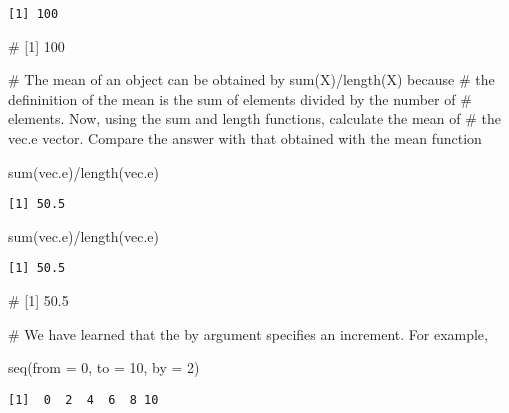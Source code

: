 \documentclass[
  letterpaper,
  DIV=11,
  numbers=noendperiod]{scrartcl}
\newenvironment{Shaded}{\begin{snugshade}}{\end{snugshade}}
\newcommand{\AttributeTok}[1]{\textcolor[rgb]{0.40,0.45,0.13}{#1}}
\newcommand{\CommentTok}[1]{\textcolor[rgb]{0.37,0.37,0.37}{#1}}
\newcommand{\DecValTok}[1]{\textcolor[rgb]{0.68,0.00,0.00}{#1}}
\newcommand{\FunctionTok}[1]{\textcolor[rgb]{0.28,0.35,0.67}{#1}}
\newcommand{\NormalTok}[1]{\textcolor[rgb]{0.00,0.23,0.31}{#1}}
\newcommand{\SpecialCharTok}[1]{\textcolor[rgb]{0.37,0.37,0.37}{#1}}
\begin{document}
\begin{verbatim}
[1] 100
\end{verbatim}

\begin{Shaded}
\begin{Highlighting}[]
\CommentTok{\# [1] 100}

\CommentTok{\# The mean of an object can be obtained by sum(X)/length(X) because}
\CommentTok{\# the defininition of the mean is the sum of elements divided by the number of }
\CommentTok{\# elements. Now, using the sum and length functions, calculate the mean of }
\CommentTok{\# the vec.e vector. Compare the answer with that obtained with the mean function}


\FunctionTok{sum}\NormalTok{(vec.e)}\SpecialCharTok{/}\FunctionTok{length}\NormalTok{(vec.e)}
\end{Highlighting}
\end{Shaded}

\begin{verbatim}
[1] 50.5
\end{verbatim}

\begin{Shaded}
\begin{Highlighting}[]
\FunctionTok{sum}\NormalTok{(vec.e)}\SpecialCharTok{/}\FunctionTok{length}\NormalTok{(vec.e)}
\end{Highlighting}
\end{Shaded}

\begin{verbatim}
[1] 50.5
\end{verbatim}

\begin{Shaded}
\begin{Highlighting}[]
\CommentTok{\# [1] 50.5}



\CommentTok{\# We have learned that the by argument specifies an increment. For example, }


\FunctionTok{seq}\NormalTok{(}\AttributeTok{from =} \DecValTok{0}\NormalTok{, }\AttributeTok{to =} \DecValTok{10}\NormalTok{, }\AttributeTok{by =} \DecValTok{2}\NormalTok{)}
\end{Highlighting}
\end{Shaded}

\begin{verbatim}
[1]  0  2  4  6  8 10
\end{verbatim}
\end{document}
